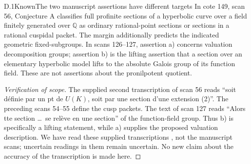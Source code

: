 \begin{result}{D.1}{Known}{The two manuscript assertions have different targets}
In cote 149, scan 56, Conjecture A classifies full profinite sections
of a hyperbolic curve over a field finitely generated over \(\mathbb Q\)
as ordinary rational-point sections or sections in a rational cuspidal
packet. The margin additionally predicts the indicated geometric
fixed-subgroups. In scans 126--127, assertion a) concerns valuation
decomposition groups; assertion b) is the lifting assertion that a
section over an elementary hyperbolic model lifts to the absolute
Galois group of its function field. These are not assertions about the
pronilpotent quotient.
\end{result}
\begin{proof}[Verification of scope]
The supplied second transcription of scan 56 reads
``soit d\'efinie par un pt de \(U(K)\), soit par une section d'une
extension (2)''. The preceding scans 54--55 define the cusp packets.
The text of scan 127 reads
``Alors tte section \ldots\ se rel\`eve en une section'' of the
function-field group. Thus b) is specifically a lifting statement,
while a) supplies the proposed valuation description.
We have read these supplied transcriptions \citep{RootManuscriptTranscriptions},
not the manuscript scans;
uncertain readings in them remain uncertain. No new claim about the
accuracy of the transcription is made here.
\end{proof}

